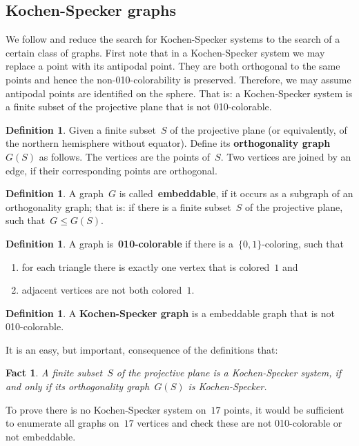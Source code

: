 \documentclass[a4paper]{article}
\newcommand{\keyword}[1]{\textbf{#1}}
\newcounter{main}
\newtheorem{fact}[main]{Fact}
\theoremstyle{definition}
\newtheorem{dfn}[main]{Definition}
\theoremstyle{remark}
\begin{document}
\subsection{Kochen-Specker graphs}
\label{sec:ksgraphs}
We follow \cite{aow11} and reduce the search for Kochen-Specker systems
to the search of a certain class of graphs.
First note that in a Kochen-Specker system we may replace a point with its
antipodal point.  They are both orthogonal to the same points and hence
the non-010-colorability is preserved.
Therefore, we may assume antipodal points are identified on the sphere.
That is: a Kochen-Specker system is a finite subset of the projective plane
that is not 010-colorable.
\begin{dfn}
Given a finite subset~$S$ of the projective plane
(or equivalently, of the northern hemisphere without equator).
Define its \keyword{orthogonality graph}~$G(S)$ as follows.
The vertices are the points of~$S$.
Two vertices are joined by an edge, if their corresponding points
are orthogonal.
\end{dfn}
\begin{dfn}
A graph~$G$ is called~\keyword{embeddable},
if it occurs as a subgraph of an orthogonality graph;
that is: if there is a finite subset~$S$ of the projective plane,
such that~$G \leq G(S)$.
\end{dfn}
\begin{dfn}
A graph is~\keyword{010-colorable}
if there is a~$\{0,1\}$-coloring, such that
\begin{enumerate}
\item
for each triangle there is exactly one vertex that is colored~$1$ and
\item
adjacent vertices are not both colored~$1$.
\end{enumerate}
\end{dfn}
\begin{dfn}
A \keyword{Kochen-Specker graph}
is a embeddable graph that is not 010-colorable.
\end{dfn}
It is an easy, but important, consequence of the definitions that:
\begin{fact}
    A finite subset~$S$ of the projective plane
    is a Kochen-Specker system,
    if and only if its orthogonality graph~$G(S)$
    is Kochen-Specker.
\end{fact}
To prove there is no Kochen-Specker system on~$17$ points,
it would be sufficient to enumerate all graphs on~$17$ vertices
and check these are not 010-colorable or not embeddable.
\end{document}
